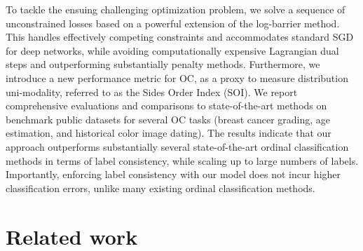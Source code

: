 \documentclass[8pt]{article}
\theoremstyle{definition}
\begin{document}
To tackle the ensuing challenging optimization problem, we solve a sequence of unconstrained losses based on a powerful extension of the log-barrier method.
This handles effectively competing constraints and accommodates standard SGD for deep networks, while avoiding computationally expensive Lagrangian dual steps and outperforming substantially penalty methods. Furthermore, we introduce a new performance metric for OC, as a proxy to measure distribution uni-modality, referred to as the Sides Order Index (SOI). We report comprehensive evaluations and comparisons to state-of-the-art methods on benchmark public datasets for several OC tasks (breast cancer grading, age estimation, and historical color image dating). The results indicate that our approach outperforms substantially several state-of-the-art ordinal classification methods in terms of label consistency, while scaling up to large numbers of labels. Importantly, enforcing label consistency with our model does not incur higher classification errors, unlike many existing ordinal classification methods.




\section{Related work}
\label{sec:related-work}
\end{document}
